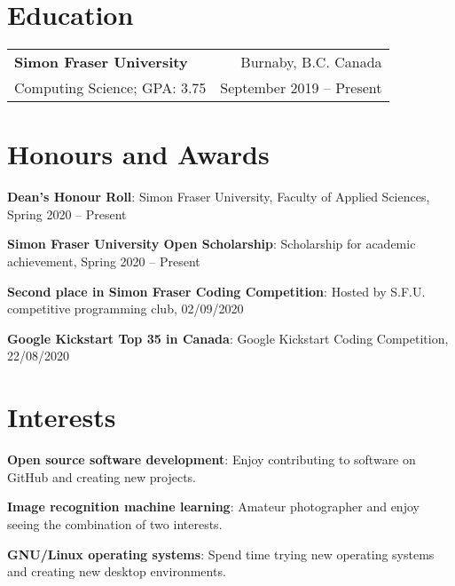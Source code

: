 \documentclass[letterpaper, 11pt]{article}
\makeatletter
\newcommand{\resumeItem}[2]{
  \small{
    \textbf{#1}{: #2 \vspace{5pt}} \\
  }
}
\newcommand{\resumeEducationHeading}[4]{
  \vspace{-1pt}
    \begin{tabular*}{0.97\textwidth}[t]{l@{\extracolsep{\fill}}r}
      \textbf{#1} & #2 \\
      \small#3 & \small #4 \\
    \end{tabular*}\vspace{-5pt}
}
\makeatother
\begin{document}
\section{Education}
    \resumeEducationHeading
      {Simon Fraser University}{Burnaby, B.C. Canada}
      {Computing Science;  GPA: 3.75}{September 2019 -- Present}

\section{Honours and Awards}
    \resumeItem{Dean's Honour Roll}
	{Simon Fraser University, Faculty of Applied Sciences, Spring 2020 -- Present}
    \resumeItem{Simon Fraser University Open Scholarship}
	{Scholarship for academic achievement, Spring 2020 -- Present}
    \resumeItem{Second place in Simon Fraser Coding Competition}
	{Hosted by S.F.U. competitive programming club, 02/09/2020}
    \resumeItem{Google Kickstart Top 35 in Canada}
	{Google Kickstart Coding Competition, 22/08/2020}

\section{Interests}
    \resumeItem{Open source software development}
    {Enjoy contributing to software on GitHub and creating new projects.}
    \resumeItem{Image recognition machine learning}
    {Amateur photographer and enjoy seeing the combination of two interests.}
    \resumeItem{GNU/Linux operating systems}
    {Spend time trying new operating systems and creating new desktop environments.}
\end{document}

